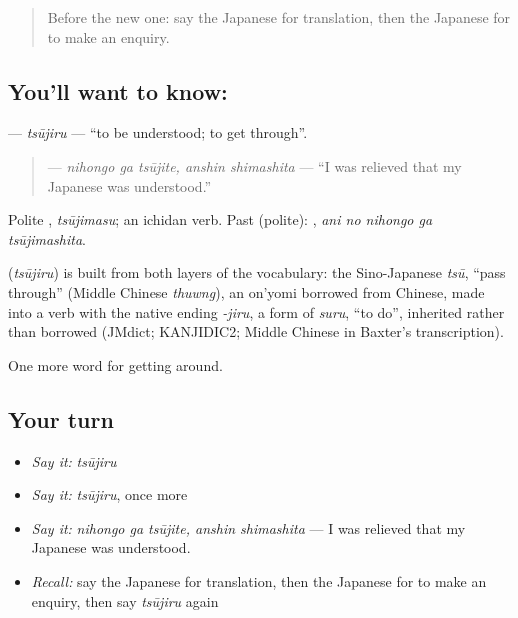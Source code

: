 \label{lesson:JA-C425-tsuujiru}



\begin{quote}
Before the new one: say the Japanese for translation, then the Japanese for to make an enquiry.
\end{quote}

\subsection*{You'll want to know: }
\textbf{} — \emph{tsūjiru} — \textquotedblleft{}to be understood; to get through\textquotedblright{}.

\begin{quote}
\textbf{ } — \emph{nihongo ga tsūjite, anshin shimashita} — \textquotedblleft{}I was relieved that my Japanese was understood.\textquotedblright{}
\end{quote}

Polite \textbf{}, \emph{tsūjimasu}; an ichidan verb. Past (polite): \textbf{  }, \emph{ani no nihongo ga tsūjimashita}.

\begin{cousinweb}
\textbf{} (\emph{tsūjiru}) is built from both layers of the vocabulary: the Sino-Japanese \emph{tsū}, \textquotedblleft{}pass through\textquotedblright{} (Middle Chinese \emph{thuwng}), an on'yomi borrowed from Chinese, made into a verb with the native ending \emph{-jiru}, a form of \emph{suru}, \textquotedblleft{}to do\textquotedblright{}, inherited rather than borrowed (JMdict; KANJIDIC2; Middle Chinese in Baxter's transcription).
\end{cousinweb}

\begin{grammarlens}[title={What you've built}]
One more word for getting around.
\end{grammarlens}

\subsection*{Your turn}
\begin{itemize}
\raggedright
  \item \emph{Say it:} \emph{tsūjiru}
  \item \emph{Say it:} \emph{tsūjiru}, once more
  \item \emph{Say it:} \emph{nihongo ga tsūjite, anshin shimashita} — I was relieved that my Japanese was understood.
  \item \emph{Recall:} say the Japanese for translation, then the Japanese for to make an enquiry, then say \emph{tsūjiru} again
\end{itemize}

